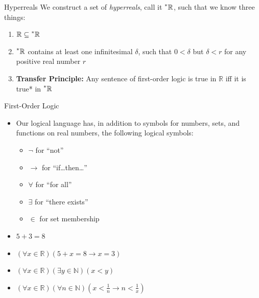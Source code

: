 \documentclass{beamer}
\theoremstyle{plain}
\theoremstyle{definition}
\newcommand{\reals}{\mathbb{R}}
\newcommand{\hreals}{\prescript{*}{}{\mathbb{R}}}
\newcommand{\nats}{\mathbb{N}}
\begin{document}
\begin{frame}{Hyperreals} 
We construct a set of \textit{hyperreals}, call it $\hreals$, such that we know three things: \vspace{4pt}
\begin{enumerate} \itemsep = 6pt
	\item $\reals \subseteq \hreals$
	\item $\hreals$ contains at least one infinitesimal $\delta$, such that $0 < \delta$ but $\delta < r$ for any positive real number $r$
	\item \textbf{Transfer Principle:} Any sentence of first-order logic is true in $\reals$ iff it is true* in $\hreals$
\end{enumerate}
\end{frame}

\begin{frame}{First-Order Logic}
\begin{itemize} \itemsep = 6pt
	\item Our logical language has, in addition to symbols for numbers, sets, and functions on real numbers, the following logical symbols:
	\begin{itemize}
		\item $\neg$ for ``not''
		\item $\to$ for ``if\ldots then\ldots''
		\item $\forall$ for ``for all''
		\item $\exists$ for ``there exists''
		\item $\in$ for set membership
	\end{itemize} 
	\item $5 + 3 = 8$
	\item $(\forall x \in \reals)(5 + x = 8 \to x = 3)$
	\item $(\forall x \in \reals)(\exists y \in \nats)(x < y)$
	\item $(\forall x \in \reals)(\forall n \in \nats)(x < \frac{1}{n} \to n < \frac{1}{x})$
\end{itemize}
\end{frame}
\end{document}
